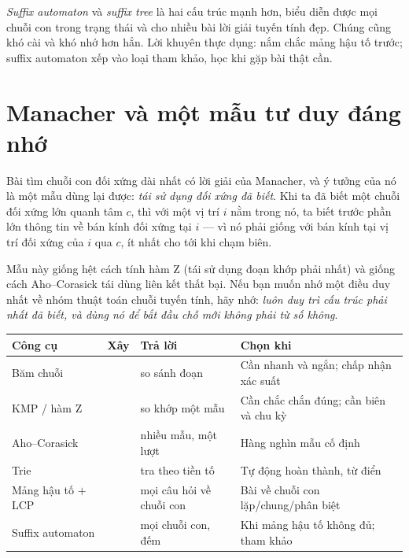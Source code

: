 \documentclass[../../algorithm.tex]{subfiles}
\begin{document}
\emph{Suffix automaton} và \emph{suffix tree} là hai cấu trúc mạnh hơn, biểu diễn được mọi chuỗi con trong  trạng thái và cho nhiều bài lời giải tuyến tính đẹp. Chúng cũng khó cài và khó nhớ hơn hẳn. Lời khuyên thực dụng: nắm chắc mảng hậu tố trước; suffix automaton xếp vào loại tham khảo, học khi gặp bài thật cần.

\section{Manacher và một mẫu tư duy đáng nhớ}

Bài tìm chuỗi con đối xứng dài nhất có lời giải  của Manacher, và ý tưởng của nó là một mẫu dùng lại được: \emph{tái sử dụng đối xứng đã biết}. Khi ta đã biết một chuỗi đối xứng lớn quanh tâm \(c\), thì với một vị trí \(i\) nằm trong nó, ta biết trước phần lớn thông tin về bán kính đối xứng tại \(i\) --- vì nó phải giống với bán kính tại vị trí đối xứng của \(i\) qua \(c\), ít nhất cho tới khi chạm biên.

Mẫu này giống hệt cách tính hàm Z (tái sử dụng đoạn khớp phải nhất) và giống cách Aho--Corasick tái dùng liên kết thất bại. Nếu bạn muốn nhớ một điều duy nhất về nhóm thuật toán chuỗi tuyến tính, hãy nhớ: \emph{luôn duy trì cấu trúc phải nhất đã biết, và dùng nó để bắt đầu chỗ mới không phải từ số không}.

\begin{center}\footnotesize
\begin{tabularx}{\linewidth}{@{}L{3.2cm}L{2.6cm}L{2.4cm}Y@{}}
\toprule
\textbf{Công cụ} & \textbf{Xây} & \textbf{Trả lời} & \textbf{Chọn khi}\\
\midrule
Băm chuỗi &  & so sánh đoạn  & Cần nhanh và ngắn; chấp nhận xác suất\\
KMP / hàm Z &  & so khớp một mẫu & Cần chắc chắn đúng; cần biên và chu kỳ\\
Aho--Corasick &  & nhiều mẫu, một lượt & Hàng nghìn mẫu cố định\\
Trie &  & tra theo tiền tố & Tự động hoàn thành, từ điển\\
Mảng hậu tố \(+\) LCP &  & mọi câu hỏi về chuỗi con & Bài về chuỗi con lặp/chung/phân biệt\\
Suffix automaton &  & mọi chuỗi con, đếm & Khi mảng hậu tố không đủ; tham khảo\\
\bottomrule
\end{tabularx}
\end{center}
\end{document}
